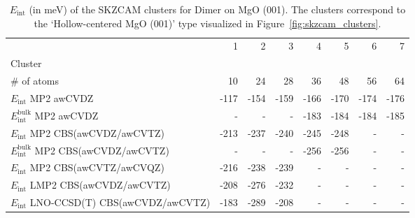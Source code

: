 \begin{table}
\caption{\label{tab:system_eint_mgo_no_dimer}$E_\textrm{int}$ (in meV) of the SKZCAM clusters for Dimer  on MgO (001). The clusters correspond to the `Hollow-centered MgO (001)' type visualized in Figure~\ref{fig:skzcam_clusters}.}
\begin{adjustbox}{center,max width=1.4\textwidth}
\begin{tabular}{lrrrrrrr}
\toprule
 & 1 & 2 & 3 & 4 & 5 & 6 & 7 \\ 
Cluster &  &  &  &  &  &  &  \\
\midrule
\# of atoms & 10 & 24 & 28 & 36 & 48 & 56 & 64 \\
$E_\textrm{int}$ MP2 awCVDZ & -117 & -154 & -159 & -166 & -170 & -174 & -176 \\
$E_\textrm{int}^\textrm{bulk}$ MP2 awCVDZ & - & - & - & -183 & -184 & -184 & -185 \\
$E_\textrm{int}$ MP2 CBS(awCVDZ/awCVTZ) & -213 & -237 & -240 & -245 & -248 & - & - \\
$E_\textrm{int}^\textrm{bulk}$ MP2 CBS(awCVDZ/awCVTZ) & - & - & - & -256 & -256 & - & - \\
$E_\textrm{int}$ MP2 CBS(awCVTZ/awCVQZ) & -216 & -238 & -239 & - & - & - & - \\
$E_\textrm{int}$ LMP2 CBS(awCVDZ/awCVTZ) & -208 & -276 & -232 & - & - & - & - \\
$E_\textrm{int}$ LNO-CCSD(T) CBS(awCVDZ/awCVTZ) & -183 & -289 & -208 & - & - & - & - \\
\bottomrule
\end{tabular}
\end{adjustbox}
\end{table}

